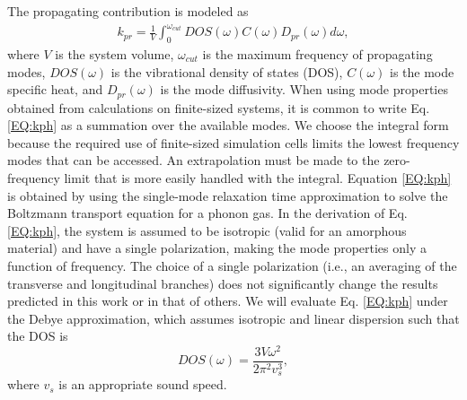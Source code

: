 \documentclass[aps,prb,onecolumn,preprint,superscriptaddress,footinbib,amsmath,amssymb,floatfix]{revtex4}
\begin{document}
The propagating contribution is modeled as
\cite{feldman_thermal_1993,feldman_numerical_1999} 
\begin{equation}\label{EQ:kph}
\begin{split}
k_{pr} = \frac{1}{V}\int_{0}^{\omega_{cut}} 
DOS(\omega) C(\omega) D_{pr}(\omega)d\omega,
\end{split}
\end{equation}
where $V$ is the system volume, $\omega_{cut}$ is the maximum 
frequency of propagating modes,  
$DOS(\omega)$ is the vibrational 
density of states (DOS), $C(\omega)$ is the mode specific heat, 
and $D_{pr}(\omega)$ is the mode diffusivity. When using mode 
properties obtained from calculations on finite-sized systems, 
it is common 
to write Eq. \eqref{EQ:kph} as a summation over the available modes.
\cite{feldman_thermal_1993,feldman_numerical_1999}
We choose the integral form because the required use of finite-sized 
simulation cells limits the lowest frequency 
modes that can be accessed. An extrapolation 
must be made to the zero-frequency limit that is more easily 
handled with the integral.
\cite{love_estimate_1990,feldman_thermal_1993,cahill_thermal_1994,
feldman_numerical_1999,baldi_thermal_2008,
liu_high_2009,yang_anomalously_2010}    
Equation \eqref{EQ:kph} is obtained by using the single-mode relaxation
time approximation to solve 
the Boltzmann transport equation for a phonon gas.
\cite{ziman_electrons_2001} In the derivation of Eq. 
\eqref{EQ:kph}, the system is assumed to be isotropic 
(valid for an amorphous material) 
and have a single polarization, 
making the mode properties only a function of frequency. The 
choice of a single polarization (i.e., an averaging 
of the transverse and longitudinal branches) 
does not significantly change the results predicted in this work  
or in that of others.
\cite{feldman_thermal_1993,cahill_thermal_1994,
feldman_numerical_1999,baldi_thermal_2008,liu_high_2009,
yang_anomalously_2010} 
We will evaluate Eq. \eqref{EQ:kph} under the Debye approximation, 
which assumes isotropic and linear dispersion such that the DOS is
\begin{equation}\label{EQ:DOS_debye}
DOS(\omega) = \frac{3V\omega^2}{2\pi^2v_{s}^3},
\end{equation}
where $v_s$ is an appropriate sound speed. 
\end{document}
